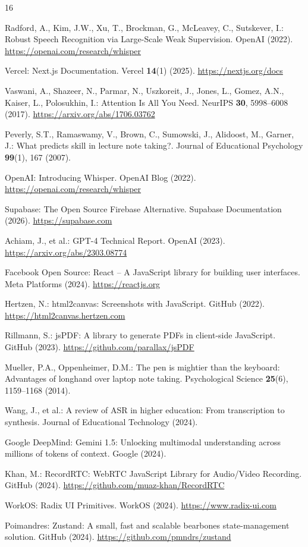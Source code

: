 \documentclass[runningheads]{llncs}
\begin{document}
%
%
%
\begin{thebibliography}{16}

Radford, A., Kim, J.W., Xu, T., Brockman, G., McLeavey, C., Sutskever, I.: Robust Speech Recognition via Large-Scale Weak Supervision. OpenAI (2022). \url{https://openai.com/research/whisper}

Vercel: Next.js Documentation. Vercel \textbf{14}(1) (2025). \url{https://nextjs.org/docs}

Vaswani, A., Shazeer, N., Parmar, N., Uszkoreit, J., Jones, L., Gomez, A.N., Kaiser, L., Polosukhin, I.: Attention Is All You Need. NeurIPS \textbf{30}, 5998--6008 (2017). \url{https://arxiv.org/abs/1706.03762}

Peverly, S.T., Ramaswamy, V., Brown, C., Sumowski, J., Alidoost, M., Garner, J.: What predicts skill in lecture note taking?. Journal of Educational Psychology \textbf{99}(1), 167 (2007).

OpenAI: Introducing Whisper. OpenAI Blog (2022). \url{https://openai.com/research/whisper}

Supabase: The Open Source Firebase Alternative. Supabase Documentation (2026). \url{https://supabase.com}

Achiam, J., et al.: GPT-4 Technical Report. OpenAI (2023). \url{https://arxiv.org/abs/2303.08774}

Facebook Open Source: React -- A JavaScript library for building user interfaces. Meta Platforms (2024). \url{https://reactjs.org}

Hertzen, N.: html2canvas: Screenshots with JavaScript. GitHub (2022). \url{https://html2canvas.hertzen.com}

Rillmann, S.: jsPDF: A library to generate PDFs in client-side JavaScript. GitHub (2023). \url{https://github.com/parallax/jsPDF}

Mueller, P.A., Oppenheimer, D.M.: The pen is mightier than the keyboard: Advantages of longhand over laptop note taking. Psychological Science \textbf{25}(6), 1159--1168 (2014).

Wang, J., et al.: A review of ASR in higher education: From transcription to synthesis. Journal of Educational Technology (2024).

Google DeepMind: Gemini 1.5: Unlocking multimodal understanding across millions of tokens of context. Google (2024).

Khan, M.: RecordRTC: WebRTC JavaScript Library for Audio/Video Recording. GitHub (2024). \url{https://github.com/muaz-khan/RecordRTC}

WorkOS: Radix UI Primitives. WorkOS (2024). \url{https://www.radix-ui.com}

Poimandres: Zustand: A small, fast and scalable bearbones state-management solution. GitHub (2024). \url{https://github.com/pmndrs/zustand}

\end{thebibliography}
\end{document}
